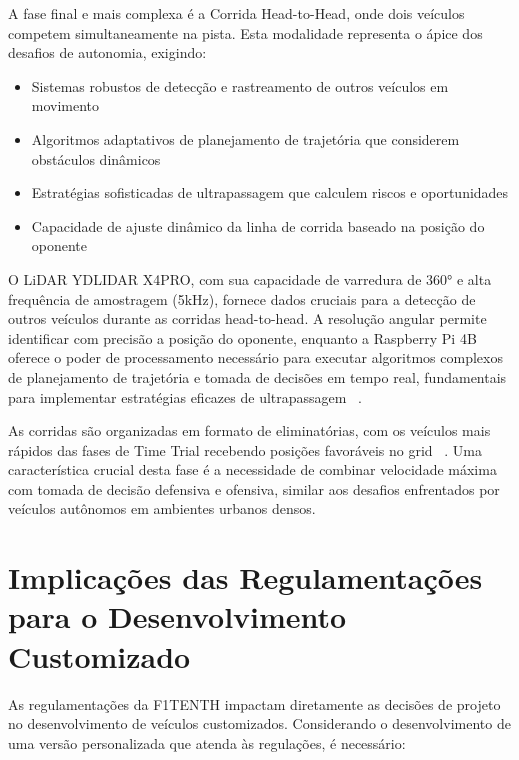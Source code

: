 A fase final e mais complexa é a Corrida Head-to-Head, onde dois veículos
competem simultaneamente na pista. Esta modalidade representa o ápice dos
desafios de autonomia, exigindo:

\begin{itemize}
      \item Sistemas robustos de detecção e rastreamento de outros veículos em movimento
      \item Algoritmos adaptativos de planejamento de trajetória que considerem obstáculos
            dinâmicos
      \item Estratégias sofisticadas de ultrapassagem que calculem riscos e oportunidades
      \item Capacidade de ajuste dinâmico da linha de corrida baseado na posição do
            oponente
\end{itemize}

O LiDAR YDLIDAR X4PRO, com sua capacidade de varredura de 360° e alta
frequência de amostragem (5kHz), fornece dados cruciais para a detecção de
outros veículos durante as corridas head-to-head. A resolução angular permite
identificar com precisão a posição do oponente, enquanto a Raspberry Pi 4B
oferece o poder de processamento necessário para executar algoritmos complexos
de planejamento de trajetória e tomada de decisões em tempo real, fundamentais
para implementar estratégias eficazes de ultrapassagem
~\cite{GopalarathnamF1TENTH2022}.

As corridas são organizadas em formato de eliminatórias, com os veículos mais
rápidos das fases de Time Trial recebendo posições favoráveis no grid
~\cite{GopalarathnamF1TENTH2022}. Uma característica crucial desta fase é a
necessidade de combinar velocidade máxima com tomada de decisão defensiva e
ofensiva, similar aos desafios enfrentados por veículos autônomos em ambientes
urbanos densos.

\section{Implicações das Regulamentações para o Desenvolvimento Customizado}

As regulamentações da F1TENTH impactam diretamente as decisões de projeto no
desenvolvimento de veículos customizados. Considerando o desenvolvimento de uma
versão personalizada que atenda às regulações, é necessário:

